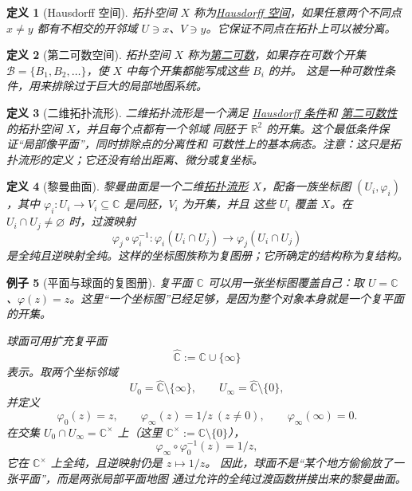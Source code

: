 \documentclass[UTF8,fontset=none,a4paper,11pt]{ctexart}
\theoremstyle{foundation-definition}
\newtheorem{definition}{定义}[section]
\theoremstyle{foundation-theorem}
\theoremstyle{foundation-proposition}
\theoremstyle{foundation-example}
\newtheorem{example}[definition]{例子}
\theoremstyle{foundation-remark}
\theoremstyle{foundation-theorem}
\newcommand{\C}{\mathbb C}
\newcommand{\term}[2]{\hyperref[#1]{#2}}
\begin{document}
\begin{definition}[Hausdorff 空间]\label{def:hausdorff}
拓扑空间 \(X\) 称为\term{def:hausdorff}{Hausdorff 空间}，如果任意两个不同点
\(x\ne y\) 都有不相交的开邻域 \(U\ni x\)、\(V\ni y\)。它保证不同点在拓扑上可以被分离。
\end{definition}

\begin{definition}[第二可数空间]\label{def:second-countable}
拓扑空间 \(X\) 称为\term{def:second-countable}{第二可数}，如果存在可数个开集
\(\mathcal B=\{B_1,B_2,\ldots\}\)，使 \(X\) 中每个开集都能写成这些 \(B_i\) 的并。
这是一种可数性条件，用来排除过于巨大的局部地图系统。
\end{definition}

\begin{definition}[二维拓扑流形]\label{def:topological-manifold}
二维拓扑流形是一个满足 \term{def:hausdorff}{Hausdorff 条件}和
\term{def:second-countable}{第二可数性}的拓扑空间 \(X\)，并且每个点都有一个邻域
同胚于 \(\mathbb R^2\) 的开集。这个最低条件保证“局部像平面”，同时排除点的分离性和
可数性上的基本病态。注意：这只是拓扑流形的定义；它还没有给出距离、微分或复坐标。
\end{definition}

\begin{definition}[黎曼曲面]\label{def:riemann-surface}
黎曼曲面是一个二维\term{def:topological-manifold}{拓扑流形} \(X\)，配备一族坐标图
\((U_i,\varphi_i)\)，其中 \(\varphi_i:U_i\to V_i\subseteq\C\) 是同胚，\(V_i\) 为开集，并且
这些 \(U_i\) 覆盖 \(X\)。在 \(U_i\cap U_j\neq\varnothing\) 时，过渡映射
\[
\varphi_j\circ\varphi_i^{-1}:
\varphi_i(U_i\cap U_j)\longrightarrow\varphi_j(U_i\cap U_j)
\]
是全纯且逆映射全纯。这样的坐标图族称为复图册；它所确定的结构称为复结构。
\end{definition}

\begin{example}[平面与球面的复图册]\label{ex:plane-sphere-atlas}
复平面 \(\mathbb C\) 可以用一张坐标图覆盖自己：取
\(U=\mathbb C\)、\(\varphi(z)=z\)。这里“一个坐标图”已经足够，是因为整个对象本身就是一个复平面的开集。

球面可用扩充复平面
\[
\widehat{\mathbb C}:=\mathbb C\cup\{\infty\}
\]
表示。取两个坐标邻域
\[
U_0=\widehat{\mathbb C}\setminus\{\infty\},\qquad
U_\infty=\widehat{\mathbb C}\setminus\{0\},
\]
并定义
\[
\varphi_0(z)=z,\qquad
\varphi_\infty(z)=1/z\ (z\ne0),\qquad
\varphi_\infty(\infty)=0.
\]
在交集 \(U_0\cap U_\infty=\mathbb C^\times\) 上（这里
\(\mathbb C^\times:=\mathbb C\setminus\{0\}\)），
\[
\varphi_\infty\circ\varphi_0^{-1}(z)=1/z,
\]
它在 \(\mathbb C^\times\) 上全纯，且逆映射仍是 \(z\mapsto1/z\)。
因此，球面不是“某个地方偷偷放了一张平面”，而是两张局部平面地图
通过允许的全纯过渡函数拼接出来的黎曼曲面。
\end{example}
\end{document}
